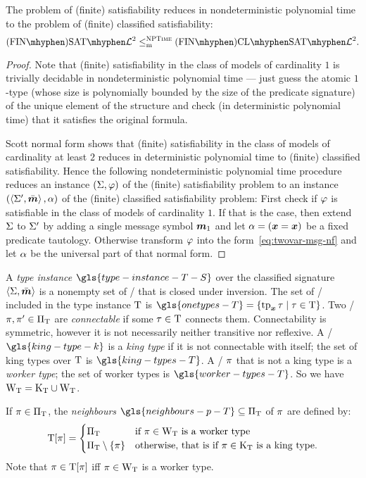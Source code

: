 \begin{remark}
The problem of (finite) satisfiability reduces in nondeterministic polynomial
time to the problem of (finite) classified satisfiability:
\[
  \FinASat{\vFo2} \red\cNP \FinAClSat{\vFo2}.
\]
\end{remark}
\begin{proof}

Note that (finite) satisfiability in the class of models of cardinality $1$ is
trivially decidable in nondeterministic polynomial time --- just guess the
atomic $1$-type (whose size is polynomially bounded by the size of the
predicate signature) of the unique element of the structure and check (in
deterministic polynomial time) that it satisfies the original formula.

Scott normal form shows that (finite) satisfiability in the class of models of
cardinality at least $2$ reduces in deterministic polynomial time to (finite)
classified satisfiability.
Hence the following nondeterministic polynomial time procedure reduces an
instance $(\mathrm{\Sigma}, \varphi)$ of the (finite) satisfiability problem to an instance
$(\left\langle \mathrm{\Sigma'},\bar{\bm{m}} \right\rangle, \alpha)$ of the (finite) classified satisfiability problem:
First check if $\varphi$ is satisfiable in the class of models of cardinality $1$.
If that is the case, then extend $\mathrm{\Sigma}$ to $\mathrm{\Sigma'}$ by adding a single message
symbol $\bm{m}_{1}$ and let $\alpha = (\bm{x} = \bm{x})$ be a fixed predicate tautology.
Otherwise transform $\varphi$ into the form~\cref{eq:twovar-msg-nf} and let
$\alpha$ be the universal part of that normal form.
\end{proof}

A \emph{type instance} $\gls{type-instance-T-S}$ over the classified signature
$\left\langle \mathrm{\Sigma},\bar{\bm{m}} \right\rangle$ is a nonempty set of \twotypes/ that is closed under
inversion.
The set of \onetypes/ included in the type instance $\mathrm{T}$ is
$\gls{onetypes-T} = \setbd{\xtp\tpt}{\tpt\in\TI}$.
Two \onetypes/ $\pi,{\pi'} \in {\Pi}_{\mathrm{T}}$ are \emph{connectable} if some
$\tau\in\mathrm{T}$ connects them.
Connectability is symmetric, however it is not necessarily neither transitive
nor reflexive.
A \onetype/ $\gls{king-type-k}$ is a \emph{king type} if it is not connectable
with itself; the set of king types over $\mathrm{T}$ is $\gls{king-types-T}$.
A \onetype/ $\pi$ that is not a king type is a \emph{worker type};
the set of worker types is $\gls{worker-types-T}$.
So we have ${\mathrm{W}}_{\mathrm{T}} = {\mathrm{K}}_{\mathrm{T}} \cup {\mathrm{W}}_{\mathrm{T}}$.

If $\pi\in{\Pi}_{\mathrm{T}}$, the \emph{neighbours} $\gls{neighbours-p-T} \subseteq\TP\TI$
of $\pi$ are defined by:
\[
  \mathrm{T}[\pi] = \begin{cases}
    {\Pi}_{\mathrm{T}} &\text{if } \pi\in{\mathrm{W}}_{\mathrm{T}} \text{ is a worker type} \\
    {\Pi}_{\mathrm{T}} \setminus \left\{\pi\right\} &\text{otherwise, that is if }
    \pi\in{\mathrm{K}}_{\mathrm{T}} \text{ is a king type.}
  \end{cases}
\]
Note that $\pi \in \mathrm{T}[\pi]$ iff $\pi \in {\mathrm{W}}_{\mathrm{T}}$ is a worker type.

